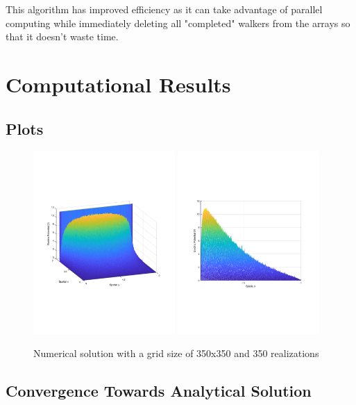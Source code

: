\documentclass{amsart}
\begin{document}
This algorithm has improved efficiency as it can take advantage of parallel computing while immediately deleting all "completed" walkers from the arrays so that it doesn't waste time.
\section{Computational Results}

\subsection{Plots}

\begin{figure}[H]
	\caption{Numerical solution with a grid size of 350x350 and 350 realizations}
	\includegraphics[width=0.48\textwidth]{solution_Dec11_9hrs_isoview.pdf}
	\includegraphics[width=0.48\textwidth]{solution_Dec11_9hrs_sideview.pdf}
\end{figure}

\subsection{Convergence Towards Analytical Solution}
\end{document}
